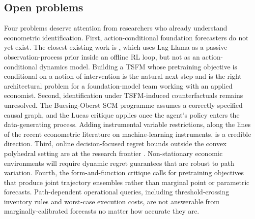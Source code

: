 \subsection{Open problems}
\label{sec:forecasting_rl_open}

Four problems deserve attention from researchers who already understand
econometric identification. First, action-conditional foundation forecasters do
not yet exist. The closest existing work is \citet{Ada2025}, which uses
Lag-Llama as a passive observation-process prior inside an offline RL loop, but
not as an action-conditional dynamics model. Building a TSFM whose pretraining
objective is conditional on a notion of intervention is the natural next step
and is the right architectural problem for a foundation-model team working with
an applied economist. Second, identification under TSFM-induced counterfactuals
remains unresolved. The Buesing-Oberst SCM programme assumes a correctly
specified causal graph, and the Lucas critique applies once the agent's policy
enters the data-generating process. Adding instrumental variable restrictions,
along the lines of the recent econometric literature on machine-learning
instruments, is a credible direction. Third, online decision-focused regret
bounds outside the convex polyhedral setting are at the research frontier
\citep{Capitaine2025}. Non-stationary economic environments will require dynamic
regret guarantees that are robust to path variation. Fourth, the
\citet{PerezDiaz2025} form-and-function critique calls for pretraining objectives
that produce joint trajectory ensembles rather than marginal point or parametric
forecasts. Path-dependent operational queries, including threshold-crossing
inventory rules and worst-case execution costs, are not answerable from
marginally-calibrated forecasts no matter how accurate they are.
